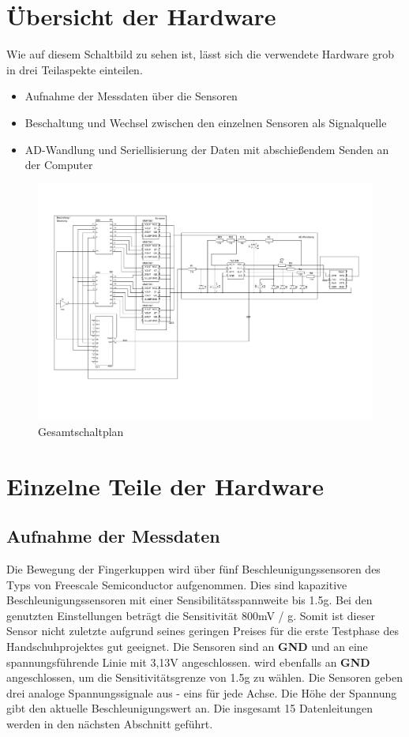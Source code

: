 \chapter{Übersicht der Hardware}
Wie auf diesem Schaltbild  zu sehen ist, lässt sich die verwendete Hardware grob in drei Teilaspekte einteilen.
\begin{itemize}
	\item Aufnahme der Messdaten über die Sensoren
	\item Beschaltung und Wechsel zwischen den einzelnen Sensoren als Signalquelle
	\item AD-Wandlung und Seriellisierung der Daten mit abschießendem Senden an der Computer
\end{itemize}

\begin{figure}[h]
	\centering
	\includegraphics[scale=0.5]{pic/Mainpage.pdf}
	\caption{Gesamtschaltplan}
	\label{pic001}
\end{figure}

\chapter{Einzelne Teile der Hardware}
\section{Aufnahme der Messdaten}
Die Bewegung der Fingerkuppen wird über fünf Beschleunigungssensoren des Typs  von Freescale Semiconductor aufgenommen. Dies sind kapazitive Beschleunigungssensoren mit einer Sensibilitätsspannweite bis 1.5g. Bei den genutzten Einstellungen beträgt die Sensitivität 800mV / g. Somit ist dieser Sensor nicht zuletzte aufgrund seines geringen Preises für die erste Testphase des Handschuhprojektes gut geeignet. Die Sensoren sind an \textbf{GND} und an eine spannungsführende Linie mit 3,13V angeschlossen.  wird ebenfalls an \textbf{GND} angeschlossen, um die Sensitivitätsgrenze von 1.5g zu wählen.
Die Sensoren geben drei analoge Spannungssignale aus - eins für jede Achse. Die Höhe der Spannung gibt den aktuelle Beschleunigungswert an. Die insgesamt 15 Datenleitungen werden in den nächsten Abschnitt geführt.

